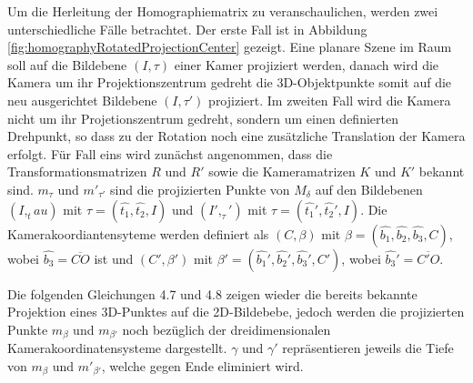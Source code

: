 Um die Herleitung der Homographiematrix zu veranschaulichen, werden zwei unterschiedliche Fälle betrachtet. Der erste Fall ist in Abbildung \ref{fig:homographyRotatedProjectionCenter} gezeigt. Eine planare Szene im Raum soll auf die Bildebene $(I,\tau)$ einer Kamer projiziert werden, danach wird die Kamera um ihr Projektionszentrum gedreht die 3D-Objektpunkte somit auf die neu ausgerichtet Bildebene $(I,\tau')$ projiziert. Im zweiten Fall wird die Kamera nicht um ihr Projetionszentrum gedreht, sondern um einen definierten Drehpunkt, so dass zu der Rotation noch eine zusätzliche Translation der Kamera erfolgt. Für Fall eins wird zunächst angenommen, dass die Transformationsmatrizen $R$ und $R'$ sowie die Kameramatrizen $K$ und $K'$ bekannt sind. $m_\tau$ und $m'_{\tau'}$ sind die projizierten Punkte von $M_\delta$ auf den Bildebenen $(I,_tau)$ mit $\tau=(\hat{t_1},\hat{t_2},I)$ und $(I',_\tau')$ mit $\tau=(\hat{t_1}',\hat{t_2}',I)$. Die Kamerakoordiantensyteme werden definiert als $(C,\beta)$ mit $\beta = (\hat{b_1},\hat{b_2},\hat{b_3},C)$, wobei $\hat{b_3} = \overline{CO}$ ist und $(C',\beta')$ mit $\beta' = (\hat{b_1}',\hat{b_2}',\hat{b_3}',C')$, wobei $\hat{b_3}' = \overline{C'O}$\cite{Elements}. 

% 
  
Die folgenden Gleichungen 4.7 und 4.8 zeigen wieder die bereits bekannte Projektion eines 3D-Punktes auf die 2D-Bildebebe, jedoch werden die projizierten Punkte $m_\beta$ und $m_{\beta'}$ noch bezüglich der dreidimensionalen Kamerakoordinatensysteme dargestellt. $\gamma$ und $\gamma'$ repräsentieren jeweils die Tiefe von $m_\beta$ und $m'_{\beta'}$, welche gegen Ende eliminiert wird\cite{Elements}.


